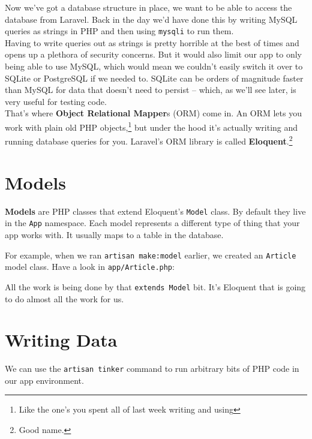 Now we've got a database structure in place, we want to be able to access the database from Laravel. Back in the day we'd have done this by writing MySQL queries as strings in PHP and then using \texttt{mysqli} to run them.
\\

Having to write queries out as strings is pretty horrible at the best of times and opens up a plethora of security concerns. But it would also limit our app to only being able to use MySQL, which would mean we couldn't easily switch it over to SQLite or PostgreSQL if we needed to. SQLite can be orders of magnitude faster than MySQL for data that doesn't need to persist – which, as we'll see later, is very useful for testing code.
\\

That's where \textbf{Object Relational Mapper}s (ORM) come in. An ORM lets you work with plain old PHP objects,\footnote{Like the one's you spent all of last week writing and using} but under the hood it's actually writing and running database queries for you. Laravel's ORM library is called \textbf{Eloquent}.\footnote{Good name.}

\section{Models}

\textbf{Models} are PHP classes that extend Eloquent's \texttt{Model} class. By default they live in the \texttt{App} namespace. Each model represents a different type of thing that your app works with. It usually maps to a table in the database.

\pagebreak

For example, when we ran \texttt{artisan make:model} earlier, we created an \texttt{Article} model class. Have a look in \texttt{app/Article.php}:


All the work is being done by that \texttt{extends Model} bit. It's Eloquent that is going to do almost all the work for us.



\section{Writing Data}

We can use the \texttt{artisan tinker} command to run arbitrary bits of PHP code in our app environment.
\\

